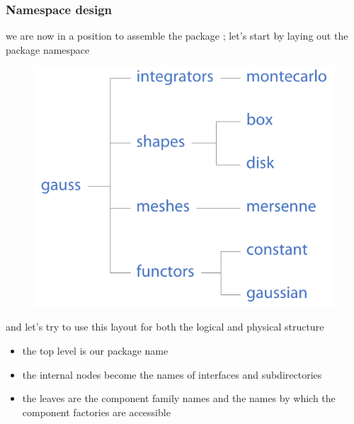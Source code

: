 \begin{frame}[fragile]
%
  \frametitle{Namespace design}
%
  we are now in a position to assemble the package ; let's start by laying out
  the package namespace
%
  \begin{figure}
    \includegraphics[scale=0.5]{figures/gauss-namespace.pdf}
  \end{figure}
%
  and let's try to use this layout for both the logical and physical structure
  \begin{itemize}
  \item the top level is our package name
  \item the internal nodes become the names of interfaces and subdirectories
  \item the leaves are the component family names and the names by which the component
    factories are accessible
  \end{itemize}
%
\end{frame}
